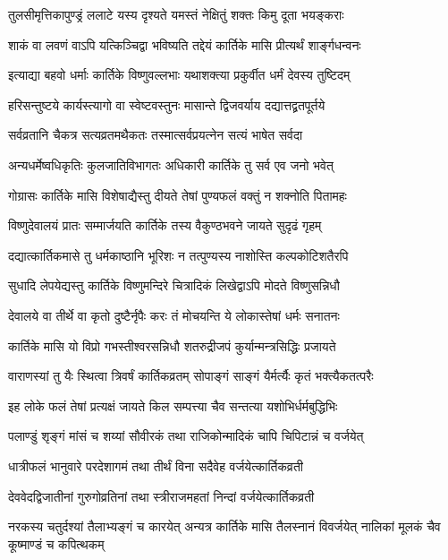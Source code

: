 \twolineshloka
{तुलसीमृत्तिकापुण्ड्रं ललाटे यस्य दृश्यते}
{यमस्तं नेक्षितुं शक्तः किमु दूता भयङ्कराः} %

\twolineshloka
{शाकं वा लवणं वाऽपि यत्किञ्चिद्वा भविष्यति}
{तद्देयं कार्तिके मासि प्रीत्यर्थं शार्ङ्गधन्वनः} %

\twolineshloka
{इत्याद्या बहवो धर्माः कार्तिके विष्णुवल्लभाः}
{यथाशक्त्या प्रकुर्वीत धर्मं देवस्य तुष्टिदम्} %

\twolineshloka
{हरिसन्तुष्टये कार्यस्त्यागो वा स्वेष्टवस्तुनः}
{मासान्ते द्विजवर्याय दद्यात्तद्व्रतपूर्तये} %

\twolineshloka
{सर्वव्रतानि चैकत्र सत्यव्रतमथैकतः}
{तस्मात्सर्वप्रयत्नेन सत्यं भाषेत सर्वदा} %

\twolineshloka
{अन्यधर्मेष्वधिकृतिः कुलजातिविभागतः}
{अधिकारी कार्तिके तु सर्व एव जनो भवेत्} %

\twolineshloka
{गोग्रासः कार्तिके मासि विशेषाद्यैस्तु दीयते}
{तेषां पुण्यफलं वक्तुं न शक्नोति पितामहः} %

\twolineshloka
{विष्णुदेवालयं प्रातः सम्मार्जयति कार्तिके}
{तस्य वैकुण्ठभवने जायते सुदृढं गृहम्} %

\twolineshloka
{दद्यात्कार्तिकमासे तु धर्मकाष्ठानि भूरिशः}
{न तत्पुण्यस्य नाशोस्ति कल्पकोटिशतैरपि} %

\twolineshloka
{सुधादि लेपयेद्यस्तु कार्तिके विष्णुमन्दिरे}
{चित्रादिकं लिखेद्वाऽपि मोदते विष्णुसन्निधौ} %

\twolineshloka
{देवालये वा तीर्थे वा कृतो दुष्टैर्नृपैः करः}
{तं मोचयन्ति ये लोकास्तेषां धर्मः सनातनः} %

\twolineshloka
{कार्तिके मासि यो विप्रो गभस्तीश्वरसन्निधौ}
{शतरुद्रीजपं कुर्यान्मन्त्रसिद्धिः प्रजायते} %

\twolineshloka
{वाराणस्यां तु यैः स्थित्वा त्रिवर्षं कार्तिकव्रतम्}
{सोपाङ्गं साङ्गं यैर्मर्त्यैः कृतं भक्त्यैकतत्परैः} %

\twolineshloka
{इह लोके फलं तेषां प्रत्यक्षं जायते किल}
{सम्पत्त्या चैव सन्तत्या यशोभिर्धर्मबुद्धिभिः} %

\twolineshloka
{पलाण्डुं शृङ्गं मांसं च शय्यां सौवीरकं तथा}
{राजिकोन्मादिकं चापि चिपिटान्नं च वर्जयेत्} %

\twolineshloka
{धात्रीफलं भानुवारे परदेशागमं तथा}
{तीर्थं विना सदैवेह वर्जयेत्कार्तिकव्रती} %

\twolineshloka
{देववेदद्विजातीनां गुरुगोव्रतिनां तथा}
{स्त्रीराजमहतां निन्दां वर्जयेत्कार्तिकव्रती} %

\threelineshloka
{नरकस्य चतुर्दश्यां तैलाभ्यङ्गं च कारयेत्}
{अन्यत्र कार्तिके मासि तैलस्नानं विवर्जयेत्}
{नालिकां मूलकं चैव कूष्माण्डं च कपित्थकम्} %

